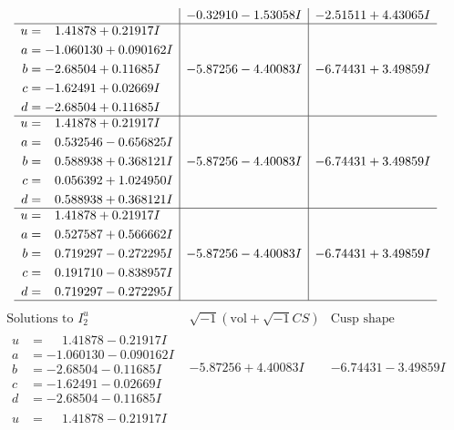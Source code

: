 \documentclass[1p]{elsarticle_modified}
\theoremstyle{definition}
\newcommand{\I}{\sqrt{-1}}
\begin{document}
$$\begin{array}{c|c|c}
 & -0.32910 - 1.53058 I & -2.51511 + 4.43065 I \\ \hline\begin{aligned}
u &= \phantom{-}1.41878 + 0.21917 I \\
a &= -1.060130 + 0.090162 I \\
b &= -2.68504 + 0.11685 I \\
c &= -1.62491 + 0.02669 I \\
d &= -2.68504 + 0.11685 I\end{aligned}
 & -5.87256 - 4.40083 I & -6.74431 + 3.49859 I \\ \hline\begin{aligned}
u &= \phantom{-}1.41878 + 0.21917 I \\
a &= \phantom{-}0.532546 - 0.656825 I \\
b &= \phantom{-}0.588938 + 0.368121 I \\
c &= \phantom{-}0.056392 + 1.024950 I \\
d &= \phantom{-}0.588938 + 0.368121 I\end{aligned}
 & -5.87256 - 4.40083 I & -6.74431 + 3.49859 I \\ \hline\begin{aligned}
u &= \phantom{-}1.41878 + 0.21917 I \\
a &= \phantom{-}0.527587 + 0.566662 I \\
b &= \phantom{-}0.719297 - 0.272295 I \\
c &= \phantom{-}0.191710 - 0.838957 I \\
d &= \phantom{-}0.719297 - 0.272295 I\end{aligned}
 & -5.87256 - 4.40083 I & -6.74431 + 3.49859 I\\
 \hline 
 \end{array}$$\newpage$$\begin{array}{c|c|c}  
\text{Solutions to }I^u_{2}& \I (\text{vol} + \sqrt{-1}CS) & \text{Cusp shape}\\
 \hline 
\begin{aligned}
u &= \phantom{-}1.41878 - 0.21917 I \\
a &= -1.060130 - 0.090162 I \\
b &= -2.68504 - 0.11685 I \\
c &= -1.62491 - 0.02669 I \\
d &= -2.68504 - 0.11685 I\end{aligned}
 & -5.87256 + 4.40083 I & -6.74431 - 3.49859 I \\ \hline\begin{aligned}
u &= \phantom{-}1.41878 - 0.21917 I \\

\end{aligned}
\end{array}$$
\end{document}
